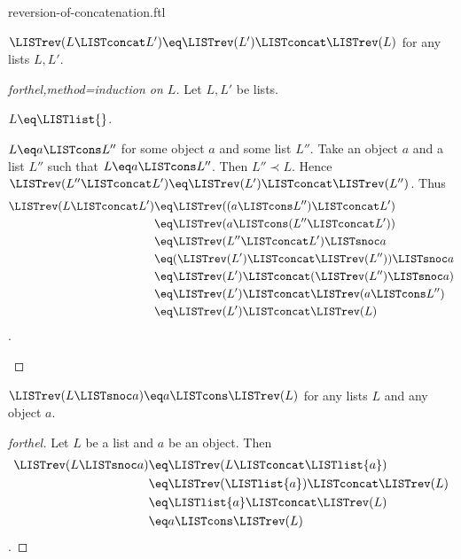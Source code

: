 \documentclass{naproche-library}
\begin{document}
\begin{smodule}[title=Reversion of Concatenation]{reversion-of-concatenation.ftl}

\begin{proposition}[forthel,id=RevOfConcatProp]
  $\LISTrev(L \LISTconcat L') \eq \LISTrev(L') \LISTconcat \LISTrev(L)$ for any lists $L, L'$.
\end{proposition}
\begin{proof}[forthel,method=induction on $L$]
  Let $L,L'$ be lists.

  \begin{case}{$L \eq \LISTlist{}$.} \end{case}

  \begin{case}{$L \eq a \LISTcons L''$ for some object $a$ and some list $L''$.}
    Take an object $a$ and a list $L''$ such that $L \eq a \LISTcons L''$.
    Then $L'' \prec L$.
    Hence $\LISTrev(L'' \LISTconcat L') \eq \LISTrev(L') \LISTconcat \LISTrev(L'')$.
    Thus
    \begin{align*}
      \LISTrev(L \LISTconcat L')
        &\eq \LISTrev((a \LISTcons L'') \LISTconcat L')\\
        &\eq \LISTrev(a \LISTcons (L'' \LISTconcat L'))\\
        &\eq \LISTrev(L'' \LISTconcat L') \LISTsnoc a\\
        &\eq (\LISTrev(L') \LISTconcat \LISTrev(L'')) \LISTsnoc a\\
        &\eq \LISTrev(L') \LISTconcat (\LISTrev(L'') \LISTsnoc a)\\
        &\eq \LISTrev(L') \LISTconcat \LISTrev(a \LISTcons L'')\\
        &\eq \LISTrev(L') \LISTconcat \LISTrev(L)
    \end{align*}.
  \end{case}
\end{proof}

\begin{proposition}[forthel,id=RevOfSnoc]
  $\LISTrev(L \LISTsnoc a) \eq a \LISTcons \LISTrev(L)$ for any lists $L$ and any object $a$.
\end{proposition}
\begin{proof}[forthel]
  Let $L$ be a list and $a$ be an object.
  Then
  \begin{align*}
    \LISTrev(L \LISTsnoc a)
      &\eq \LISTrev(L \LISTconcat \LISTlist{a})\\
      &\eq \LISTrev(\LISTlist{a}) \LISTconcat \LISTrev(L)\\
      &\eq \LISTlist{a} \LISTconcat \LISTrev(L)\\
      &\eq a \LISTcons \LISTrev(L)
  \end{align*}.
\end{proof}
\end{smodule}
\end{document}
